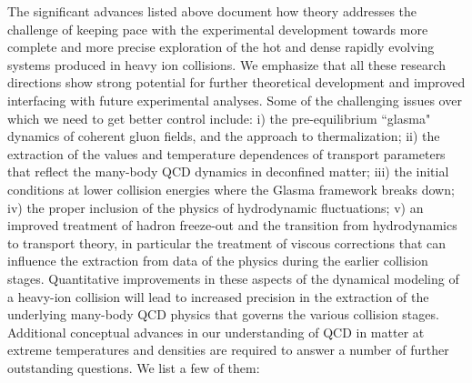 The significant advances listed above document how theory addresses the challenge of keeping pace with the
experimental development towards more complete and more precise exploration of the hot and dense rapidly 
evolving systems produced in heavy ion collisions. We emphasize that all these research directions show strong 
potential for further theoretical development and improved interfacing with future experimental analyses.
Some of the challenging issues over which we need to get better control include: 
i) the pre-equilibrium ``glasma" 
dynamics of coherent gluon fields, and the approach to thermalization; 
ii) the extraction of the values and temperature dependences of transport parameters that reflect the many-body QCD dynamics in deconfined matter; 
iii) the initial conditions at lower collision energies where the Glasma framework breaks down; 
iv) the proper inclusion of the physics of hydrodynamic fluctuations; 
v) an improved treatment of hadron freeze-out and the transition from hydrodynamics  to transport theory, in particular the treatment of viscous corrections that can influence the extraction from data of the physics during the earlier collision stages. 
Quantitative improvements in these aspects of the dynamical modeling of a heavy-ion collision will lead to increased precision in the extraction of the underlying many-body QCD physics that governs the various collision stages. Additional conceptual advances in our understanding of QCD in matter at extreme temperatures and densities are required to answer a number of further outstanding questions. We  list a few of them:

 
